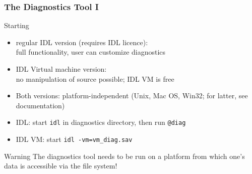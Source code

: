\documentclass[10pt]{beamer}
\begin{document}
\begin{frame}[fragile]
  \frametitle{The Diagnostics Tool I}

\begin{block}{Starting}

\begin{itemize}
\item regular IDL version (requires IDL licence):\\
full functionality, user can customize diagnostics
\item IDL Virtual machine version:\\
no manipulation of source possible; IDL VM is free
\item Both versions: platform-independent (Unix, Mac OS, Win32; for latter, see documentation)
\end{itemize}

\vspace{0.2cm}

\begin{itemize}
\item IDL: start \verb|idl| in diagnostics directory, then run \verb|@diag|
\item IDL VM: start \verb|idl -vm=vm_diag.sav|
\end{itemize}

\begin{alertblock}{Warning}
The diagnostics tool needs to be run on a platform from which one's data is accessible via
the file system!
\end{alertblock}

\end{block}

\end{frame}

\end{document}
